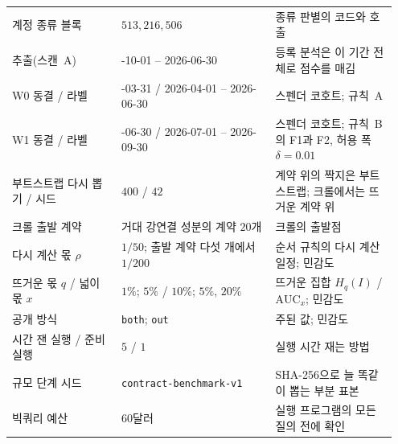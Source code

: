 {\begin{longtable}{@{}>{\raggedright\arraybackslash}p{0.27\linewidth}>{\raggedright\arraybackslash}p{0.38\linewidth}>{\raggedright\arraybackslash}p{0.30\linewidth}@{}}
계정 종류 블록 & $513{,}216{,}506$ & 종류 판별의 코드와 호출 \\
추출(스캔~A) & 2023-10-01 -- 2026-06-30 & 등록 분석은 이 기간 전체로 점수를 매김 \\
W0 동결 / 라벨 & 2026-03-31 / 2026-04-01 -- 2026-06-30 & 스펜더 코호트; 규칙~A \\
W1 동결 / 라벨 & 2026-06-30 / 2026-07-01 -- 2026-09-30 & 스펜더 코호트; 규칙~B의 F1과 F2, 허용 폭 $\delta=0.01$ \\
부트스트랩 다시 뽑기 / 시드 & $400$ / $42$ & 계약 위의 짝지은 부트스트랩; 크롤에서는 뜨거운 계약 위 \\
크롤 출발 계약 & 거대 강연결 성분의 계약 $20$개 & 크롤의 출발점 \\
다시 계산 몫 $\rho$ & $1/50$; 출발 계약 다섯 개에서 $1/200$ & 순서 규칙의 다시 계산 일정; 민감도 \\
뜨거운 몫 $q$ / 넓이 몫 $x$ & $1\%$; $5\%$ / $10\%$; $5\%$, $20\%$ & 뜨거운 집합 $H_q(I)$ / $\mathrm{AUC}_x$; 민감도 \\
공개 방식 & \texttt{both}; \texttt{out} & 주된 값; 민감도 \\
시간 잰 실행 / 준비 실행 & $5$ / $1$ & 실행 시간 재는 방법 \\
규모 단계 시드 & \texttt{contract-benchmark-v1} & SHA-256으로 늘 똑같이 뽑는 부분 표본 \\
빅쿼리 예산 & $60$달러 & 실행 프로그램의 모든 질의 전에 확인 \\
\end{longtable}
}







